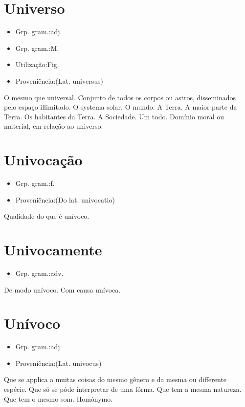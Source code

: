 \documentclass{article}
\begin{document}
\section{Universo}
\begin{itemize}
\item {Grp. gram.:adj.}
\end{itemize}
\begin{itemize}
\item {Grp. gram.:M.}
\end{itemize}
\begin{itemize}
\item {Utilização:Fig.}
\end{itemize}
\begin{itemize}
\item {Proveniência:(Lat. \textunderscore universus\textunderscore )}
\end{itemize}
O mesmo que \textunderscore universal\textunderscore .
Conjunto de todos os corpos ou astros, disseminados pelo espaço illimitado.
O systema solar.
O mundo.
A Terra.
A maior parte da Terra.
Os habitantes da Terra.
A Sociedade.
Um todo.
Domínio moral ou material, em relação ao universo.
\section{Univocação}
\begin{itemize}
\item {Grp. gram.:f.}
\end{itemize}
\begin{itemize}
\item {Proveniência:(Do lat. \textunderscore univocatio\textunderscore )}
\end{itemize}
Qualidade do que é unívoco.
\section{Univocamente}
\begin{itemize}
\item {Grp. gram.:adv.}
\end{itemize}
De modo unívoco.
Com causa unívoca.
\section{Unívoco}
\begin{itemize}
\item {Grp. gram.:adj.}
\end{itemize}
\begin{itemize}
\item {Proveniência:(Lat. \textunderscore univocus\textunderscore )}
\end{itemize}
Que se applica a muitas coisas do mesmo gênero e da mesma ou differente espécie.
Que só se póde interpretar de uma fórma.
Que tem a mesma natureza.
Que tem o mesmo som.
Homónymo.
\end{document}
